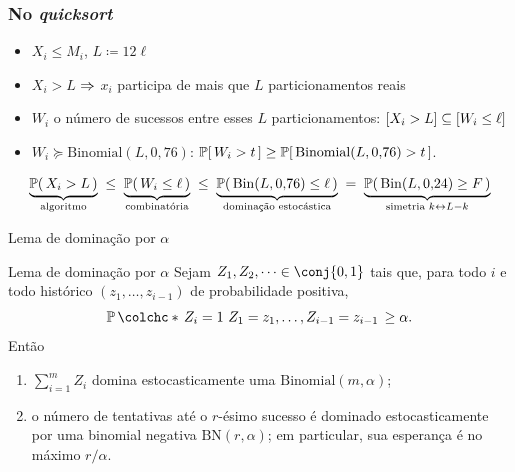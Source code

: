 \documentclass[aspectratio=169]{beamer}
\begin{document}
\begin{frame}
  \frametitle{No \textit{quicksort}}

  \begin{itemize}[<+->]\itemsep=.6cm
    
  \item $X_i\leq M_i$,  $ L \coloneqq  12\ell$

    
  \item $X_i>L$ $\Rightarrow$ $x_i$ participa de mais que $L$ particionamentos
    reais

  \item $W_i$ o número de sucessos entre esses $L$ particionamentos:
    $\lbrack X_i>L\rbrack\subseteq\lbrack W_i\leq \ell\rbrack$
    

  \item $W_i \succeq \mathrm{Binomial}(L,0{,}76)$:
    $\ProbE{ W_i > t} \geq \ProbE{\text{Binomial}(L, 0{,}76 ) > t }$.

  \end{itemize}
  
  \pause

  
  $$
\underbrace{\Prob{X_i>L}}_{\text{algoritmo}}
\;\le\;
\underbrace{\Prob{W_i\le\ell}}_{\text{combinatória}}
\;\le\;
\underbrace{\Prob{\mathrm{Bin}(L,0{,}76)\le\ell}}_{\text{dominação estocástica}}
\;=\;
\underbrace{\Prob{\mathrm{Bin}(L,0{,}24)\geq F}}_{\text{simetria } k\leftrightarrow L-k}
$$
\end{frame}


\begin{frame}{Lema de dominação por $\alpha$}

  \begin{block}{Lema de dominação por $\alpha$}
    Sejam $Z_1,Z_2,\dots\in\conj{0,1}$ tais que, para todo $i$ e todo
    histórico $(z_1,\dots,z_{i-1})$ de probabilidade positiva,
    \[
      \ProbCE{Z_i=1}{Z_1=z_1,\dots,Z_{i-1}=z_{i-1}}\geq \alpha.
    \]
    Então
    \begin{enumerate}
    \item[\textbf{(a)}] $\sum_{i=1}^mZ_i$ domina estocasticamente uma
      $\mathrm{Binomial}(m,\alpha)$;
    \item[\textbf{(b)}] o número de tentativas até o $r$-ésimo sucesso
      é dominado estocasticamente por uma binomial negativa
      $\mathrm{BN}(r,\alpha)$; em particular, sua esperança é no máximo
      $r/\alpha$.
    \end{enumerate}
  \end{block}

\end{frame}
\end{document}
